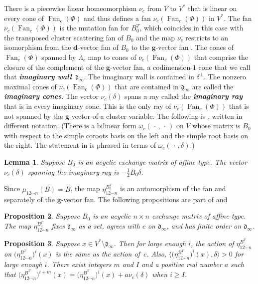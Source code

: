 \documentclass{amsart}
\newtheorem{proposition}{Proposition}[section]
\newtheorem{lemma}[proposition]{Lemma}
\theoremstyle{definition}
\theoremstyle{remark}
\numberwithin{equation}{section}
\newcommand{\newword}[1]{\textbf{\emph{#1}}}
\newcommand{\br}[1]{{\langle #1 \rangle}}
\newcommand{\0}{{\mathbf{0}}}
\newcommand{\g}{\mathbf{g}}
\newcommand{\Fan}{\operatorname{Fan}}
\renewcommand{\d}{{\mathfrak d}}
\newcommand{\dd}{{\mathbf d}}
\newcommand{\RSChar}{\Phi}
\newcommand{\RS}{\RSChar}
\newcommand{\APTChar}{\Lambda}
\newcommand{\APT}[1]{\APTChar_{#1}}
\begin{document}
There is a piecewise linear homeomorphism $\nu_c$ from $V$ to $V^*$ that is linear on every cone of $\Fan_c(\RS)$ and thus defines a fan $\nu_c(\Fan_c(\RS))$ in $V^*$.
The fan $\nu_c(\Fan_c(\RS))$ is the mutation fan for $B_0^T$, which coincides in this case with the transposed cluster scattering fan of $B_0$ and the map $\nu_c$ restricts to an isomorphism from the $\dd$-vector fan of $B_0$ to the $\g$-vector fan \cite[Theorem~2.9]{affscat}.
The cones of $\Fan_c(\RS)$ spanned by $\APT{c}$ map to cones of $\nu_c(\Fan_c(\RS))$ that comprise the closure of the complement of the $\g$-vector fan, a codimension-$1$ cone that we call that \newword{imaginary wall}~$\d_\infty$.
The imaginary wall is contained in $\delta^\perp$.
The nonzero maximal cones of $\nu_c(\Fan_c(\RS))$ that are contained in $\d_\infty$ are called the \newword{imaginary cones}.
The vector $\nu_c(\delta)$ spans a ray called the \newword{imaginary ray} that is in every imaginary cone.
This is the only ray of $\nu_c(\Fan_c(\RS))$ that is not spanned by the $\g$-vector of a cluster variable.
The following  is \cite[Lemma~5.9]{affscat}, written in different notation.
(There is a bilinear form $\omega_c(\,\cdot\,,\,\cdot\,)$ on $V$ whose matrix is $B_0$ with respect to the simple coroots basis on the left and the simple root basis on the right.
The statement in \cite{affscat} is phrased in terms of $\omega_c(\,\cdot\,,\delta)$.)

\begin{lemma}\label{nu delta}  
Suppose $B_0$ is an acyclic exchange matrix of affine type.
The vector~$\nu_c(\delta)$ spanning the imaginary ray is $-\frac12B_0\delta$.
\end{lemma}

Since $\mu_{12\cdots n}(B)=B$, the map $\eta^{B_0^T}_{12\cdots n}$ is an automorphism of the fan and separately of the $\g$-vector fan.
The following propositions are part of \cite[Proposition~7.31(4)]{affscat} and \cite[Proposition~7.32]{affscat}

\begin{proposition}\label{eta on dinf}
Suppose $B_0$ is an acyclic $n\times n$ exchange matrix of affine type.
The map $\eta^{B_0^T}_{12\cdots n}$ fixes $\d_\infty$ as a set, agrees with $c$ on $\d_\infty$, and has finite order on $\d_\infty$.
\end{proposition}

\begin{proposition}\label{delta limit eta}
Suppose $x\in V^*\setminus\d_\infty$.
Then for large enough $i$, the action of $\eta_{12\cdots n}^{B^T}$ on $\bigl(\eta_{12\cdots n}^{B^T}\bigr)^i(x)$ is the same as the action of~$c$.
Also, $\br{\bigl(\eta_{12\cdots n}^{B^T}\bigr)^i(x),\delta}>0$ for large enough $i$.
There exist integers $m$ and $I$ and a positive real number $a$ such that $\bigl(\eta_{12\cdots n}^{B^T}\bigr)^{i+m}(x)=\bigl(\eta_{12\cdots n}^{B^T}\bigr)^i(x)+a\nu_c(\delta)$ when $i\ge I$.
\end{proposition}
\end{document}
